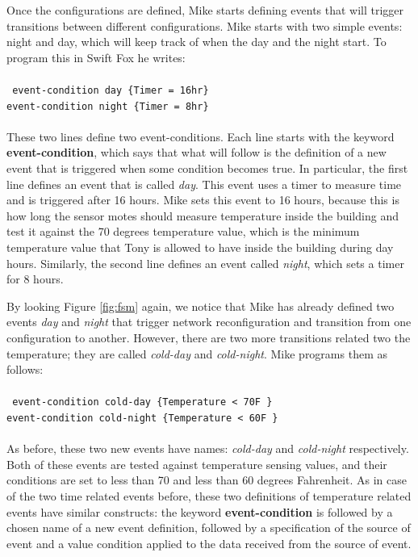 Once the configurations are defined, Mike starts defining events that will
trigger transitions between different configurations. Mike starts with two 
simple events: night and day, which will keep track of when the day and the
night start. To program this in Swift Fox he writes:			\\
\\
\texttt{
event-condition day \{Timer = 16hr\}					\\
event-condition night \{Timer = 8hr\}					\\
}\\
These two lines define two event-conditions. Each line starts with the
keyword \textbf{event-condition}, which says that what will follow is the
definition of a new event that is triggered when some condition becomes
true. In particular, the first line defines an event that is called
\textit{day}. This event uses a timer to measure time and is triggered
after 16 hours. Mike sets this event to 16 hours, because this is how long 
the sensor motes should measure temperature inside the building and test it
against the 70 degrees temperature value, which is the minimum temperature 
value that Tony is allowed to have inside the building during day
hours. Similarly, the second line defines an event called \textit{night},
which sets a timer for 8 hours.

By looking Figure \ref{fig:fsm} again, we notice that Mike has already
defined two events \textit{day} and \textit{night} that trigger network
reconfiguration and transition from one configuration to another. However, 
there are two more transitions related two the temperature; they are called
\textit{cold-day} and \textit{cold-night}. Mike programs them as follows:\\
\\
\texttt{
event-condition cold-day \{Temperature < 70F \}				\\
event-condition cold-night \{Temperature < 60F \}			\\
}\\
As before, these two new events have names: \textit{cold-day} and
\textit{cold-night} respectively. Both of these events are tested against
temperature sensing values, and their conditions are set to less than 70
and less than 60 degrees Fahrenheit. As in case of the two time related
events before, these two definitions of temperature related events have
similar constructs: the keyword \textbf{event-condition} is followed by a
chosen name of a new event definition, followed by a specification of the
source of event and a value condition applied to the data received from the
source of event.

